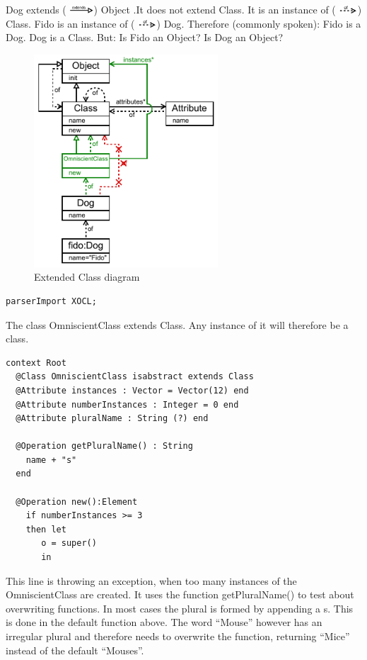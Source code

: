 \documentclass{scrreprt}
\newcommand{\of}{%
\includegraphics[height=8pt]{img/arrowOf.png}\hspace{1mm}}
\newcommand{\extends}{%
\includegraphics[height=8pt]{img/arrowExtends.png}\hspace{1mm}}
\begin{document}
Dog extends (\extends) {\ttfamily Object} .It does not extend {\ttfamily Class}. It is an instance of (\of) {\ttfamily Class}. {\ttfamily Fido} is an instance of (\of) {\ttfamily Dog}. Therefore (commonly spoken): Fido is a Dog. Dog is a Class. But: Is {\ttfamily Fido} an {\ttfamily Object}? Is {\ttfamily Dog} an {\ttfamily Object}?


\begin{figure}[ht!]
	\centering
	\includegraphics[width=195pt]{img/classDiagram2.pdf}
	\caption{Extended Class diagram}
	\label{fig:exampleDogClassDiagram2}
\end{figure} 

\begin{verbatim}
parserImport XOCL;

\end{verbatim}
The class {\ttfamily OmniscientClass} extends {\ttfamily Class}. Any instance of
it will therefore be a class.
\begin{verbatim}
context Root
  @Class OmniscientClass isabstract extends Class 
  @Attribute instances : Vector = Vector(12) end
  @Attribute numberInstances : Integer = 0 end
  @Attribute pluralName : String (?) end
  
  @Operation getPluralName() : String  
    name + "s"
  end
  
  @Operation new():Element
    if numberInstances >= 3 
    then let
       o = super()
       in
\end{verbatim}
This line is throwing an exception, when too many instances of the
OmniscientClass are created. It uses the function {\ttfamily getPluralName()} to
test about overwriting functions. In most cases the plural is formed by
appending a {\ttfamily s}. This is done in the default function above. The word ``Mouse''
however has an irregular plural and therefore needs to overwrite the function,
returning ``Mice'' instead of the default ``Mouses''.
\end{document}
